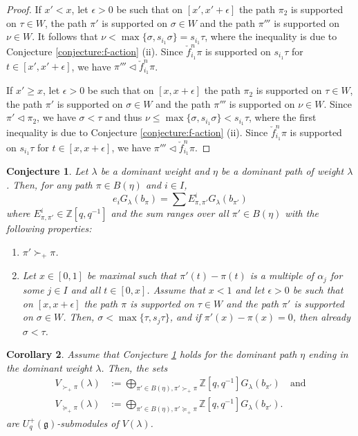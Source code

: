 \documentclass[final]{amsart}
\theoremstyle{plain}
\newtheorem{corollary}{Corollary}[section]
\newtheorem{conjecture}[corollary]{Conjecture}
\theoremstyle{definition}
\newcommand{\bbZ}{\mathbb Z}
\newcommand{\frakg}{\mathfrak g}
\newcommand{\cf}{\check{f}}
\begin{document}
\begin{proof}
    If $x' < x$, let $\epsilon > 0$ be such that on $[x', x'+\epsilon]$ the path $\pi_2$ is supported on $\tau \in W$, the path $\pi'$ is supported on $\sigma \in W$ and the path $\pi'''$ is supported on $\nu \in W$.
    It follows that $\nu < \max\{\sigma, s_{i_1}\sigma\} = s_{i_1}\tau$, where the inequality is due to Conjecture \ref{conjecture:f-action} (ii).
    Since $\cf_{i_1}^n\pi$ is supported on $s_{i_1}\tau$ for $t\in [x',x'+\epsilon]$, we have $\pi''' \triangleleft \cf_{i_1}^n\pi$.

    If $x' \ge x$, let $\epsilon > 0$ be such that on $[x, x+\epsilon]$ the path $\pi_2$ is supported on $\tau \in W$, the path $\pi'$ is supported on $\sigma \in W$ and the path $\pi'''$ is supported on $\nu \in W$.
    Since $\pi' \triangleleft \pi_2$, we have $\sigma < \tau$ and thus $\nu \le \max\{\sigma, s_{i_1}\sigma\} < s_{i_1}\tau$, where the first inequality is due to Conjecture \ref{conjecture:f-action} (ii).
    Since $\cf_{i_1}^n\pi$ is supported on $s_{i_1}\tau$ for $t\in [x,x+\epsilon]$, we have $\pi''' \triangleleft \cf_{i_1}^n\pi$.
\end{proof}

\begin{conjecture}
    \label{conjecture:e-action}
    Let $\lambda$ be a dominant weight and $\eta$ be a dominant path of weight $\lambda$.
    Then, for any path $\pi \in B(\eta)$ and $i \in I$,
    \[
        e_i G_\lambda(b_\pi) = \sum E_{\pi,\pi'}^i G_\lambda(b_{\pi'})
    \]
    where $E_{\pi,\pi'}^i \in \bbZ[q, q^{-1}]$ and the sum ranges over all $\pi' \in B(\eta)$ with the following properties:
    \begin{enumerate}
        \item $\pi' \succ_+ \pi$.
        \item Let $x \in [0, 1]$ be maximal such that $\pi'(t) - \pi(t)$ is a multiple of $\alpha_j$ for some $j \in I$ and all $t \in [0, x]$.
        Assume that $x < 1$ and let $\epsilon > 0$ be such that on $[x, x+\epsilon]$ the path $\pi$ is supported on $\tau \in W$ and the path $\pi'$ is supported on $\sigma \in W$.
        Then, $\sigma < \max\{\tau, s_j\tau\}$, and if $\pi'(x) - \pi(x) = 0$, then already $\sigma < \tau$.
    \end{enumerate}
\end{conjecture}

\begin{corollary}
    Assume that Conjecture \ref{conjecture:e-action} holds for the dominant path $\eta$ ending in the dominant weight $\lambda$.
    Then, the sets
    \begin{align*}
        V_{\succ_+ \pi}(\lambda) &:= \bigoplus_{\pi'\in B(\eta),  \pi' \succ_+ \pi} \bbZ[q,q^{-1}] G_\lambda(b_{\pi'}) \quad \text{and} \\
        V_{\succeq_+ \pi}(\lambda) &:= \bigoplus_{\pi'\in B(\eta),\pi' \succeq_+ \pi} \bbZ[q,q^{-1}] G_\lambda(b_{\pi'}).
    \end{align*}
    are $U_q^+(\frakg)$-submodules of $V(\lambda)$.
\end{corollary}
\end{document}
